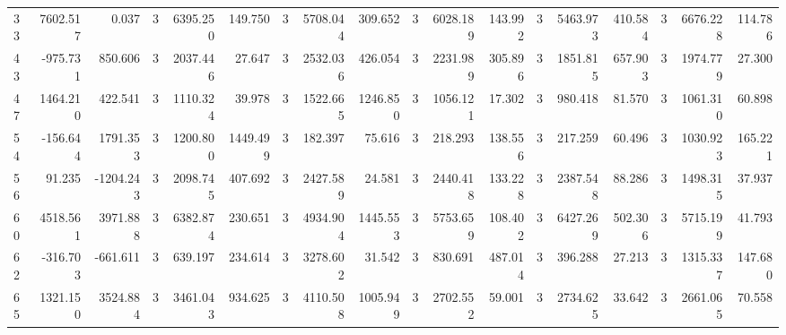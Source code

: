\begin{table}[ht]
\begin{tabular}{lrrrrrrrrrrrrrrrrr}
33 & 7602.517 & 0.037 & 3 & 6395.250 & 149.750 & 3 & 5708.044 & 309.652 & 3 & 6028.189 & 143.992 & 3 & 5463.973 & 410.584 & 3 & 6676.228 & 114.786 \\
43 & -975.731 & 850.606 & 3 & 2037.446 & 27.647 & 3 & 2532.036 & 426.054 & 3 & 2231.989 & 305.896 & 3 & 1851.815 & 657.903 & 3 & 1974.779 & 27.300 \\
47 & 1464.210 & 422.541 & 3 & 1110.324 & 39.978 & 3 & 1522.665 & 1246.850 & 3 & 1056.121 & 17.302 & 3 & 980.418 & 81.570 & 3 & 1061.310 & 60.898 \\
54 & -156.644 & 1791.353 & 3 & 1200.800 & 1449.499 & 3 & 182.397 & 75.616 & 3 & 218.293 & 138.556 & 3 & 217.259 & 60.496 & 3 & 1030.923 & 165.221 \\
56 & 91.235 & -1204.243 & 3 & 2098.745 & 407.692 & 3 & 2427.589 & 24.581 & 3 & 2440.418 & 133.228 & 3 & 2387.548 & 88.286 & 3 & 1498.315 & 37.937 \\
60 & 4518.561 & 3971.888 & 3 & 6382.874 & 230.651 & 3 & 4934.904 & 1445.553 & 3 & 5753.659 & 108.402 & 3 & 6427.269 & 502.306 & 3 & 5715.199 & 41.793 \\
62 & -316.703 & -661.611 & 3 & 639.197 & 234.614 & 3 & 3278.602 & 31.542 & 3 & 830.691 & 487.014 & 3 & 396.288 & 27.213 & 3 & 1315.337 & 147.680 \\
65 & 1321.150 & 3524.884 & 3 & 3461.043 & 934.625 & 3 & 4110.508 & 1005.949 & 3 & 2702.552 & 59.001 & 3 & 2734.625 & 33.642 & 3 & 2661.065 & 70.558 \\
\hline
\end{tabular}
\end{table}

